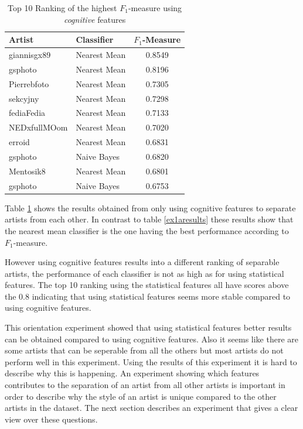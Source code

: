 \begin{table}[htb]
    \centering
    \begin{tabular}
        { | l | l | c |} 
        \hline
        Artist & Classifier & $F_1$-Measure \\
        \hline
        giannisgx89 & Nearest Mean & 0.8549 \\ 
        gsphoto & Nearest Mean & 0.8196 \\ 
        Pierrebfoto & Nearest Mean & 0.7305 \\ 
        sekcyjny & Nearest Mean & 0.7298 \\ 
        fediaFedia & Nearest Mean & 0.7133 \\
        NEDxfullMOom & Nearest Mean & 0.7020 \\
        erroid & Nearest Mean & 0.6831 \\
        gsphoto & Naive Bayes & 0.6820 \\
        Mentosik8 & Nearest Mean & 0.6801 \\
        gsphoto & Naive Bayes & 0.6753 \\
        \hline 
    \end{tabular}
    \caption{Top 10 Ranking of the highest $F_1$-measure using \textit{cognitive} features}
    \label{ex1bresults}
\end{table}

Table \ref{ex1bresults} shows the results obtained from only using cognitive features to separate artists from each other.
In contrast to table \ref{ex1aresults} these results show that the nearest mean classifier is the one having the best performance according to $F_1$-measure.

However using cognitive features results into a different ranking of separable artists, the performance of each classifier is not as high as for using statistical features.
The top 10 ranking using the statistical features all have scores above the 0.8 indicating that using statistical features seems more stable compared to using cognitive features.

This orientation experiment showed that using statistical features better results can be obtained compared to using cognitive features.
Also it seems like there are some artists that can be seperable from all the others but most artists do not perform well in this experiment.
Using the results of this experiment it is hard to describe why this is happening. 
An experiment showing which features contributes to the separation of an artist from all other artists is important in order to describe why the style of an artist is unique compared to the other artists in the dataset.
The next section describes an experiment that gives a clear view over these questions.

